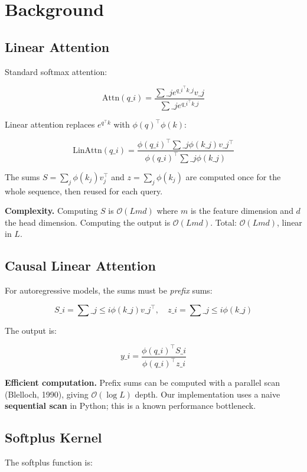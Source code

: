 
\section{Background}

\subsection{Linear Attention}

Standard softmax attention:

\[
\text{Attn}(q\_i) = \frac{\sum\_j e^{q\_i^\top k\_j} v\_j}{\sum\_j e^{q\_i^\top k\_j}}
\tag{3.1}
\]

Linear attention replaces $e^{q^\top k}$ with $\phi(q)^\top \phi(k)$:

\[
\text{LinAttn}(q\_i) = \frac{\phi(q\_i)^\top \sum\_j \phi(k\_j) v\_j^\top}{\phi(q\_i)^\top \sum\_j \phi(k\_j)}
\tag{3.2}
\]

The sums $S = \sum_j \phi(k_j) v_j^\top$ and $z = \sum_j \phi(k_j)$ are 
computed once for the whole sequence, then reused for each query.

\textbf{Complexity.} Computing $S$ is $\mathcal{O}(L m d)$ where $m$ is the 
feature dimension and $d$ the head dimension. Computing the output is 
$\mathcal{O}(L m d)$. Total: $\mathcal{O}(L m d)$, linear in $L$.

\subsection{Causal Linear Attention}

For autoregressive models, the sums must be \textit{prefix} sums:

\[
S\_i = \sum\_{j \le i} \phi(k\_j) v\_j^\top, \quad
z\_i = \sum\_{j \le i} \phi(k\_j)
\tag{3.3}
\]

The output is:

\[
y\_i = \frac{\phi(q\_i)^\top S\_i}{\phi(q\_i)^\top z\_i}
\tag{3.4}
\]

\textbf{Efficient computation.} Prefix sums can be computed with a parallel 
scan (Blelloch, 1990), giving $\mathcal{O}(\log L)$ depth. Our implementation 
uses a naive \textbf{sequential scan} in Python; this is a known performance 
bottleneck.

\subsection{Softplus Kernel}

The softplus function is:

